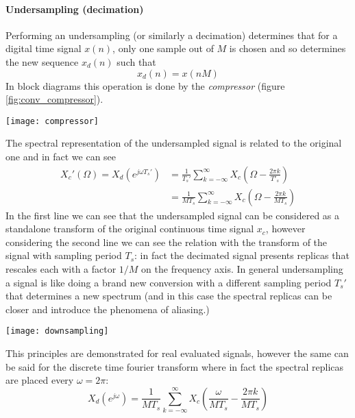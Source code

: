 	\paragraph{Undersampling (decimation)} Performing an undersampling (or similarly a decimation) determines that for a digital time signal $x(n)$, only one sample out of $M$ is chosen and so determines the new sequence $x_d(n)$ such that
	\[ x_d(n) = x(nM) \]
	In block diagrams this operation is done by the \textit{compressor} (figure \ref{fig:conv_compressor}).
	\begin{SCfigure}[2][bht]
		\centering \texttt{[image: compressor]}
		\caption{compressor as block diagram for describing an undersampling.} \label{fig:conv_compressor}
	\end{SCfigure}
	 
	The spectral representation of the undersampled signal is related to the original one and in fact we can see
	\begin{align*}
		X_c' (\Omega) = X_d\left(e^{j\omega T_s'}\right) & = \frac 1 {T_s'} \sum_{k=-\infty}^\infty X_c\left(\Omega - \frac{2\pi k}{T'_s}\right) \\
		& = \frac{1}{MT_s}\sum_{k=-\infty}^\infty X_c\left( \Omega - \frac{2\pi k}{MT_s} \right)	
	\end{align*}
	In the first line we can see that the undersampled signal can be considered as a standalone transform of the original continuous time signal $x_c$, however considering the second line we can see the relation with the transform of the signal with sampling period $T_s$: in fact the decimated signal presents replicas that rescales each with a factor $1/M$ on the frequency axis. In general undersampling a signal is like doing a brand new conversion with a different sampling period $T_s'$ that determines a new spectrum (and in this case the spectral replicas can be closer and introduce the phenomena of aliasing.)
	\begin{SCfigure}[2][bht]
		\centering \texttt{[image: downsampling]}
		\caption{original spectral response of a signal sampled with period $T_s$ (upper) and response of the signal considering an undersampling with $M=2$ (down).}
	\end{SCfigure}

	This principles are demonstrated for real evaluated signals, however the same can be said for the discrete time fourier transform where in fact the spectral replicas are placed every $\omega = 2\pi$:
	\[ X_d(e^{j\omega}) = \frac 1 {MT_s} \sum_{k=-\infty}^\infty X_c\left( \frac{\omega}{MT_s} - \frac{2\pi k}{MT_s}\right) \]
		
